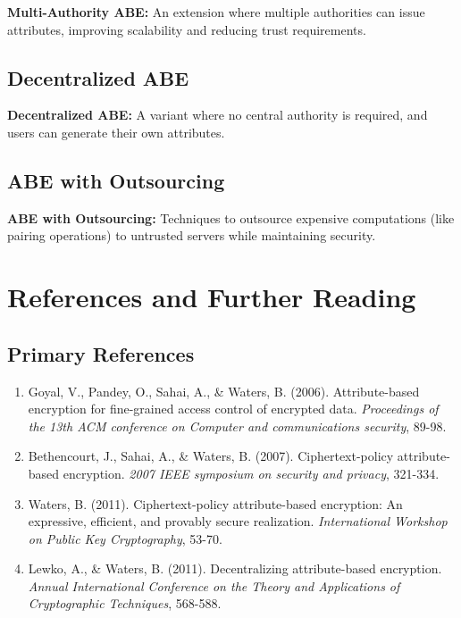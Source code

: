 \documentclass[11pt,a4paper]{article}
\begin{document}
\begin{definitionbox}
\textbf{Multi-Authority ABE:} An extension where multiple authorities can issue attributes, improving scalability and reducing trust requirements.
\end{definitionbox}

\subsection{Decentralized ABE}

\begin{definitionbox}
\textbf{Decentralized ABE:} A variant where no central authority is required, and users can generate their own attributes.
\end{definitionbox}

\subsection{ABE with Outsourcing}

\begin{definitionbox}
\textbf{ABE with Outsourcing:} Techniques to outsource expensive computations (like pairing operations) to untrusted servers while maintaining security.
\end{definitionbox}

\section{References and Further Reading}

\subsection{Primary References}

\begin{enumerate}
    \item Goyal, V., Pandey, O., Sahai, A., \& Waters, B. (2006). Attribute-based encryption for fine-grained access control of encrypted data. \textit{Proceedings of the 13th ACM conference on Computer and communications security}, 89-98.
    \item Bethencourt, J., Sahai, A., \& Waters, B. (2007). Ciphertext-policy attribute-based encryption. \textit{2007 IEEE symposium on security and privacy}, 321-334.
    \item Waters, B. (2011). Ciphertext-policy attribute-based encryption: An expressive, efficient, and provably secure realization. \textit{International Workshop on Public Key Cryptography}, 53-70.
    \item Lewko, A., \& Waters, B. (2011). Decentralizing attribute-based encryption. \textit{Annual International Conference on the Theory and Applications of Cryptographic Techniques}, 568-588.
\end{enumerate}
\end{document}
